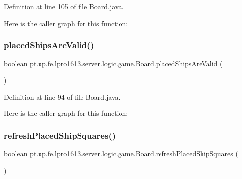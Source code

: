 Definition at line 105 of file Board.\+java.

Here is the caller graph for this function\+:
\hypertarget{classpt_1_1up_1_1fe_1_1lpro1613_1_1server_1_1logic_1_1game_1_1_board_a8da7e24b29b48930983ad769b447ff65}{}\label{classpt_1_1up_1_1fe_1_1lpro1613_1_1server_1_1logic_1_1game_1_1_board_a8da7e24b29b48930983ad769b447ff65} 
\subsubsection{\texorpdfstring{placed\+Ships\+Are\+Valid()}{placedShipsAreValid()}}
{\footnotesize\ttfamily boolean pt.\+up.\+fe.\+lpro1613.\+server.\+logic.\+game.\+Board.\+placed\+Ships\+Are\+Valid (\begin{DoxyParamCaption}{ }\end{DoxyParamCaption})}



Definition at line 94 of file Board.\+java.

Here is the caller graph for this function\+:
\hypertarget{classpt_1_1up_1_1fe_1_1lpro1613_1_1server_1_1logic_1_1game_1_1_board_a1360050b45e38cf819885dc19e564a09}{}\label{classpt_1_1up_1_1fe_1_1lpro1613_1_1server_1_1logic_1_1game_1_1_board_a1360050b45e38cf819885dc19e564a09} 
\subsubsection{\texorpdfstring{refresh\+Placed\+Ship\+Squares()}{refreshPlacedShipSquares()}}
{\footnotesize\ttfamily boolean pt.\+up.\+fe.\+lpro1613.\+server.\+logic.\+game.\+Board.\+refresh\+Placed\+Ship\+Squares (\begin{DoxyParamCaption}{ }\end{DoxyParamCaption})}



